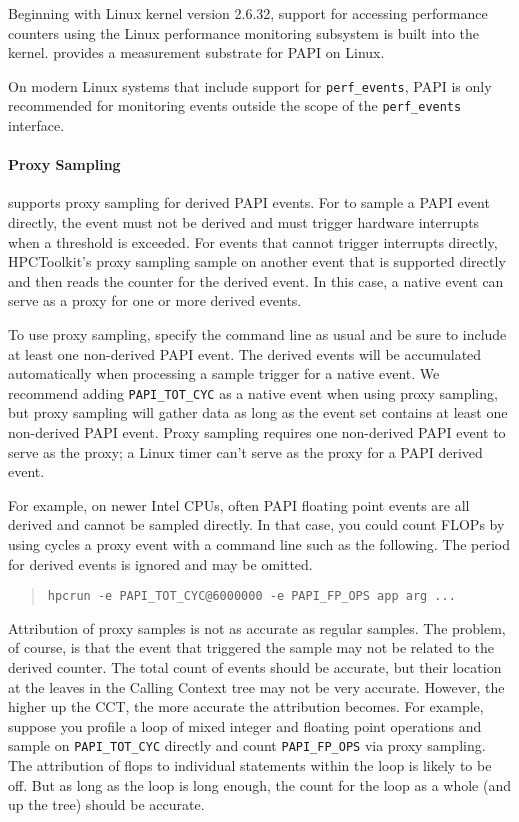 Beginning with Linux kernel version 2.6.32,
support for accessing  performance counters 
using the Linux \perfevents{} performance monitoring subsystem is
built into the kernel.  \perfevents{}  provides a measurement substrate for PAPI on Linux.

On modern Linux systems that include support
for \verb|perf_events|, PAPI is only recommended for monitoring 
events outside the scope of the \verb|perf_events| interface. 

\paragraph{Proxy Sampling}

\HPCToolkit{} supports proxy sampling for derived PAPI events.
For \HPCToolkit{} to sample a PAPI event directly, the event must not be
derived and must trigger hardware interrupts when a threshold is exceeded.  
For events that cannot trigger interrupts directly, HPCToolkit's proxy sampling
sample on another event that is supported directly and then reads the 
counter for the derived event. In this case, 
a native event can serve as a proxy for one or more derived events.

To use proxy sampling, specify the \hpcrun{} command line as usual and
be sure to include at least one non-derived PAPI event.  The derived
events will be accumulated automatically when processing a sample trigger for a native event.
We recommend adding \verb|PAPI_TOT_CYC| as a native event when using proxy sampling, but
proxy sampling will gather data  as long as the event set contains at least one
non-derived PAPI event.  Proxy sampling requires one non-derived PAPI event to serve as the proxy;
a Linux timer can't serve as the proxy for a PAPI derived event.

For example, on newer Intel CPUs, often PAPI floating point events are
all derived and cannot be sampled directly.  In that case, you could
count FLOPs by using cycles a proxy event with a command line such as
the following.  The period for derived events is ignored and may be
omitted.

\begin{quote}
\begin{verbatim}
hpcrun -e PAPI_TOT_CYC@6000000 -e PAPI_FP_OPS app arg ...
\end{verbatim}
\end{quote}

Attribution of proxy samples is not as accurate as regular samples.
The problem, of course, is that the event that triggered the sample
may not be related to the derived counter.  The total count of events
should be accurate, but their location at the leaves in the Calling
Context tree may not be very accurate.  However, the higher up the
CCT, the more accurate the attribution becomes.  For example, suppose
you profile a loop of mixed integer and floating point operations and
sample on \verb|PAPI_TOT_CYC| directly and count \verb|PAPI_FP_OPS|
via proxy sampling.  The attribution of flops to individual statements
within the loop is likely to be off.  But as long as the loop is long
enough, the count for the loop as a whole (and up the tree) should be
accurate.

